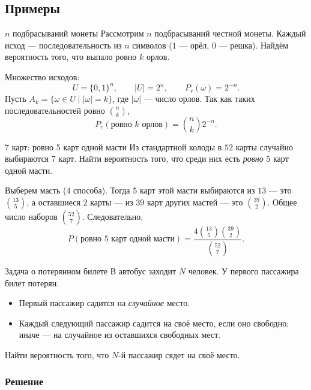 \subsection{Примеры}

\begin{Example}{$n$ подбрасываний монеты}{}
	Рассмотрим \(n\) подбрасываний честной монеты. Каждый исход — последовательность из \(n\) символов ($1$ — орёл, $0$ — решка). Найдём вероятность того, что выпало ровно \(k\) орлов.
\end{Example}
Множество исходов:
\[
U=\{0,1\}^n,
\qquad |U|=2^n,
\qquad P_r(\omega)=2^{-n}.
\]
Пусть \(A_k=\{\omega\in U \mid |\omega|=k\}\), где \(|\omega|\) — число орлов. Так как таких последовательностей ровно \(\binom{n}{k}\),
\[
P_r(\text{ровно }k\text{ орлов})
=\binom{n}{k}2^{-n}.
\]

\begin{Example}{7 карт: ровно 5 карт одной масти}{}
	Из стандартной колоды в \(52\) карты случайно выбираются \(7\) карт. Найти вероятность того, что среди них есть \textit{ровно} 5 карт одной масти.
\end{Example}
Выберем масть ($4$ способа). Тогда $5$ карт этой масти выбираются из $13$ — это $\binom{13}{5}$, а оставшиеся $2$ карты — из $39$ карт других мастей — это $\binom{39}{2}$. Общее число наборов $\binom{52}{7}$. Следовательно,
\[
P(\text{ровно 5 карт одной масти})
=\frac{4\binom{13}{5}\binom{39}{2}}{\binom{52}{7}}.
\]

\begin{Example}{Задача о потерянном билете}{}
	В автобус заходит \(N\) человек. У первого пассажира билет потерян.
	\begin{itemize}
		\item Первый пассажир садится на \textit{случайное} место.
		\item Каждый следующий пассажир садится на своё место, если оно свободно; иначе — на случайное из оставшихся свободных мест.
	\end{itemize}
	Найти вероятность того, что \(N\)-й пассажир сядет на своё место.
\end{Example}

\subsubsection*{Решение}

